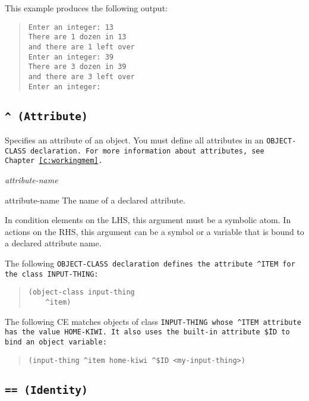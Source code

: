 This example produces the following output:

\begin{quote}
\begin{verbatim}
Enter an integer: 13
There are 1 dozen in 13
and there are 1 left over
Enter an integer: 39
There are 3 dozen in 39
and there are 3 left over
Enter an integer:
\end{verbatim}
\end{quote}

\subsection{\tt{\^} (Attribute)}

Specifies an attribute of an object. You must define all attributes in
an \tt{OBJECT-CLASS} declaration. For more information about
attributes, see Chapter~\ref{c:workingmem}.

\Format

\ct\it{attribute-name}

\begin{arguments}
\item[attribute-name] The name of a declared attribute.

  In condition elements on the LHS, this argument must be a symbolic
  atom. In actions on the RHS, this argument can be a symbol or a
  variable that is bound to a declared attribute name.
\end{arguments}

\Example

The following \tt{OBJECT-CLASS} declaration defines the attribute
\tt{\^{}ITEM} for the class \tt{INPUT-THING}:

\begin{quote}
\begin{verbatim}
(object-class input-thing
    ^item)
\end{verbatim}
\end{quote}

The following CE matches objects of class \tt{INPUT-THING} whose
\tt{\^{}ITEM} attribute has the value \tt{HOME-KIWI}. It also uses the
built-in attribute \tt{\^\$ID} to bind an object variable:

\begin{quote}
\begin{verbatim}
(input-thing ^item home-kiwi ^$ID <my-input-thing>)
\end{verbatim}
\end{quote}

\subsection{\tt{==} (Identity)}

